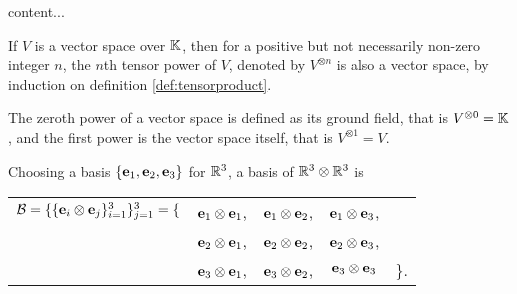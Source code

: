 	\begin{definition}
		content...
	\end{definition}
	
	\begin{definition}
		If $V$ is a vector space over $\mathbb{K}$, then for a positive but not necessarily non-zero integer $n$, the $n$th tensor power of $V$, denoted by $V^{\otimes n}$ is also a vector space, by induction on definition \ref{def:tensorproduct}.
		\begin{notation}
			The zeroth power of a vector space is defined as its ground field, that is $V^{\otimes 0} = \mathbb{K}$, and the first power is the vector space itself, that is $V^{\otimes 1} = V$.
		\end{notation}
	\end{definition}
	
	\begin{example}[$\R^3 \otimes \R^3 = {\R^3}^{\otimes 2}$]
		Choosing a basis $\{\mathbf{e}_1, \mathbf{e}_2, \mathbf{e}_3\}$ for $\mathbb{R}^3$, a basis of $\mathbb{R}^3 \otimes \mathbb{R}^3$ is 
		\begin{table}[hbt!]\centering\begin{tabular}{r c c c l}
			$\mathcal{B} = \{\{ \mathbf{e}_i \otimes \mathbf{e}_j \}_{i=1}^3\}_{j=1}^3 = \{$ & $\mathbf{e}_1 \otimes \mathbf{e}_1$, & $\mathbf{e}_1 \otimes \mathbf{e}_2$, & $\mathbf{e}_1 \otimes \mathbf{e}_3$, &  \\
			     & $\mathbf{e}_2 \otimes \mathbf{e}_1$, & $\mathbf{e}_2 \otimes \mathbf{e}_2$, & $\mathbf{e}_2 \otimes \mathbf{e}_3$, &  \\
			     & $\mathbf{e}_3 \otimes \mathbf{e}_1$, & $\mathbf{e}_3 \otimes \mathbf{e}_2$, & $\mathbf{e}_3 \otimes \mathbf{e}_3$ & $\}$.
		\end{tabular}\end{table}
	\end{example}